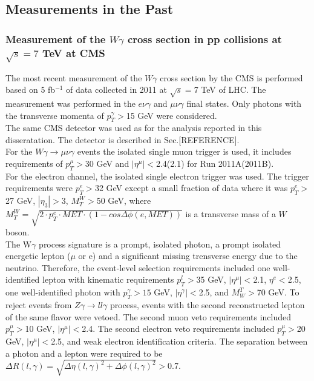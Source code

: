 \subsection{Measurements in the Past}

\subsubsection{Measurement of the $W\gamma$ cross section in pp collisions at $\sqrt{s}=7$ TeV at CMS}

The most recent measurement of the $W\gamma$ cross section by the CMS is performed based on 5 fb$^{-1}$ of data collected in 2011 at $\sqrt{s}=$7 TeV of LHC. The measurement was performed in the $e\nu\gamma$ and $\mu\nu\gamma$ final states. Only photons with the transverse momenta of $p_T^{\gamma}>$15 GeV were considered.\\
The same CMS detector was used as for the analysis reported in this disseratation. The detector is described in Sec.[REFERENCE].\\



For the $W\gamma\rightarrow\mu\nu\gamma$ events the isolated single muon trigger is used, it includes requirements of $p_T^{\mu}>$30 GeV and $|\eta^{\mu}|<$2.4(2.1) for Run 2011A(2011B).\\
 
For the electron channel, the isolated single electron trigger was used. The trigger requirements were $p_T^e>$32 GeV except a small fraction of data where it was $p_T^e>$27 GeV, $|\eta_3|>$3, $M_T^W>$50 GeV, where $M_T^W=\sqrt{2 \cdot p_T^e \cdot MET \cdot (1-cos\Delta\phi(e,MET))}$ is a transverse mass of a $W$ boson.\\

The W$\gamma$ process signature is a prompt, isolated photon, a prompt isolated energetic lepton ($\mu$ or e) and a significant missing trensverse energy due to the neutrino. Therefore, the event-level selection requirements included one well-identified lepton with kinematic requirements $p_T^l>$35 GeV, $|\eta^\mu|<$2.1, $\eta^e<$2.5, one well-identified photon with $p_T^\gamma>15$ GeV, $|\eta^\gamma|<$2.5, and $M_W^T>$70 GeV. To reject events from $Z\gamma\rightarrow ll\gamma$ process, events with the second reconstructed lepton of the same flavor were vetoed. The second muon veto requirements included $p_T^\mu>$10 GeV, $|\eta^\mu|<$2.4. The second electron veto requirements included $p_T^\mu>$20 GeV, $|\eta^\mu|<$2.5, and weak electron identification criteria. The separation between a photon and a lepton were required to be $\Delta R(l,\gamma) = \sqrt{\Delta \eta(l,\gamma)^2 + \Delta \phi(l,\gamma)^2}>$0.7.\\  

